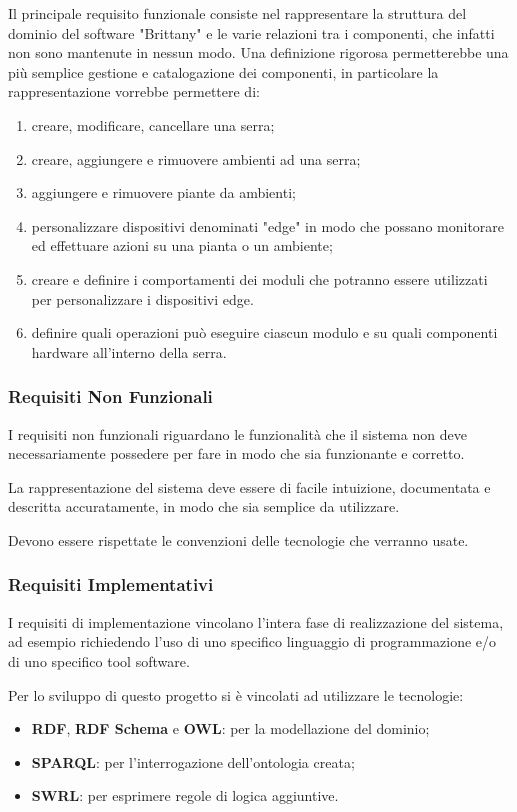 \noindent Il principale requisito funzionale consiste nel rappresentare la struttura del dominio del software "Brittany" e le varie relazioni tra i componenti, che infatti non sono mantenute in nessun modo. Una definizione rigorosa permetterebbe una più semplice gestione e catalogazione dei componenti, in particolare la rappresentazione vorrebbe permettere di:
\begin{enumerate}
	\item creare, modificare, cancellare una serra;
	\item creare, aggiungere e rimuovere ambienti ad una serra;
	\item aggiungere e rimuovere piante da ambienti;
	\item personalizzare dispositivi denominati "edge" in modo che possano monitorare ed effettuare azioni su una pianta o un ambiente;
	\item creare e definire i comportamenti dei moduli che potranno essere utilizzati per personalizzare i dispositivi edge.
	\item definire quali operazioni può eseguire ciascun modulo e su quali componenti hardware all'interno della serra.
\end{enumerate}

\subsubsection{Requisiti Non Funzionali}
I requisiti non funzionali riguardano le funzionalità che il sistema non deve necessariamente possedere per fare in modo che sia funzionante e corretto.\newline

\noindent La rappresentazione del sistema deve essere di facile intuizione, documentata e descritta accuratamente, in modo che sia semplice da utilizzare.\newline

\noindent Devono essere rispettate le convenzioni delle tecnologie che verranno usate.

\subsubsection{Requisiti Implementativi}

I requisiti di implementazione vincolano l’intera fase di realizzazione del sistema, ad esempio richiedendo l’uso di uno specifico linguaggio di programmazione e/o di uno specifico tool software.

\noindent Per lo sviluppo di questo progetto si è vincolati ad utilizzare le tecnologie:
\begin{itemize}
	\item \textbf{RDF}, \textbf{RDF Schema} e \textbf{OWL}: per la modellazione del dominio;
	\item \textbf{SPARQL}: per l'interrogazione dell'ontologia creata;
	\item \textbf{SWRL}: per esprimere regole di logica aggiuntive.
\end{itemize}
